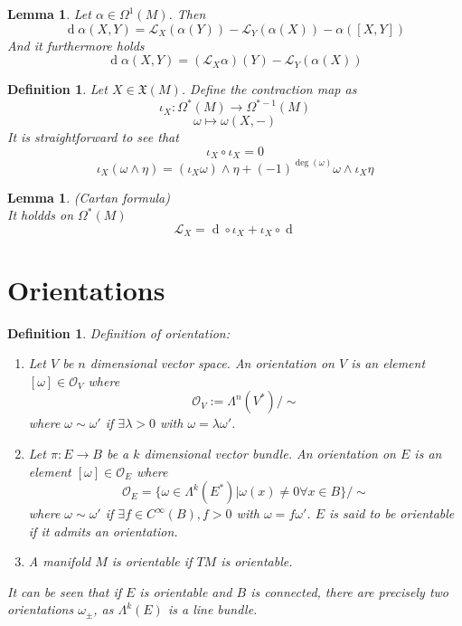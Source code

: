 \documentclass{article}
\numberwithin{theorem}{section}
\newtheorem{lemma}[theorem]{Lemma}
\newtheorem{definition}[theorem]{Definition}
\renewcommand{\d}[1]{\ensuremath{\operatorname{d}\!{#1}}}
\newcommand{\1}{\mathds{1}}
\begin{document}
\begin{lemma}
    Let $\alpha \in \Omega^1(M)$. Then 
    \[ \d \alpha(X,Y) = \mathcal{L}_X(\alpha(Y)) - \mathcal{L}_Y(\alpha(X)) - \alpha([X,Y])\]
    And it furthermore holds 
    \[ \d \alpha(X,Y) = (\mathcal{L}_X \alpha)(Y) - \mathcal{L}_Y(\alpha(X)) \]
\end{lemma}

\begin{definition}
    Let $X \in \mathfrak{X}(M)$. Define the contraction map as 
    \[ \iota_X : \Omega^*(M) \to \Omega^{*-1}(M) \]
    \[ \omega \mapsto \omega(X,-) \]
    It is straightforward to see that 
    \[ \iota_X \circ \iota_X = 0 \]
    \[ \iota_X(\omega \wedge \eta) = (\iota_X \omega) \wedge \eta + (-1)^{\deg(\omega)} \omega \wedge \iota_X\eta \]
\end{definition}

\begin{lemma}(Cartan formula)\\
    It holdds on $\Omega^*(M)$ 
    \[ \mathcal{L}_X = \d{} \circ \iota_X  + \iota_X \circ \d{} \]
    
\end{lemma}

\section{Orientations}

\begin{definition}
    Definition of orientation: 
    \begin{enumerate}
        \item Let $V$ be $n$ dimensional vector space. An orientation on $V$ is an element $[\omega] \in \mathcal{O}_V $ where 
        \[ \mathcal{O}_V := \Lambda^n(V^*) / \sim   \]
        where $ \omega \sim \omega' $ if $\exists \lambda > 0 $ with $\omega = \lambda \omega'$. 
        \item Let $\pi: E \to B $ be a $k$ dimensional vector bundle. An orientation on $E$ is an element $[\omega] \in \mathcal{O}_E$ where 
        \[ \mathcal{O}_E = \{ \omega \in \Lambda^k(E^*) |  \omega(x) \neq 0 \forall x \in B \} / \sim  \]
        where $\omega \sim \omega'$ if $\exists f \in C^\infty(B), f>0$ with $\omega = f \omega' $. $E$ is said to be orientable if it admits an orientation. 
        \item A manifold $M$ is orientable if $TM$ is orientable. 
    \end{enumerate}
    It can be seen that if $E$ is orientable and $B$ is connected, there are precisely two orientations $\omega_{\pm}$, as $\Lambda^k(E)$ is a line bundle. 
\end{definition}
\end{document}
